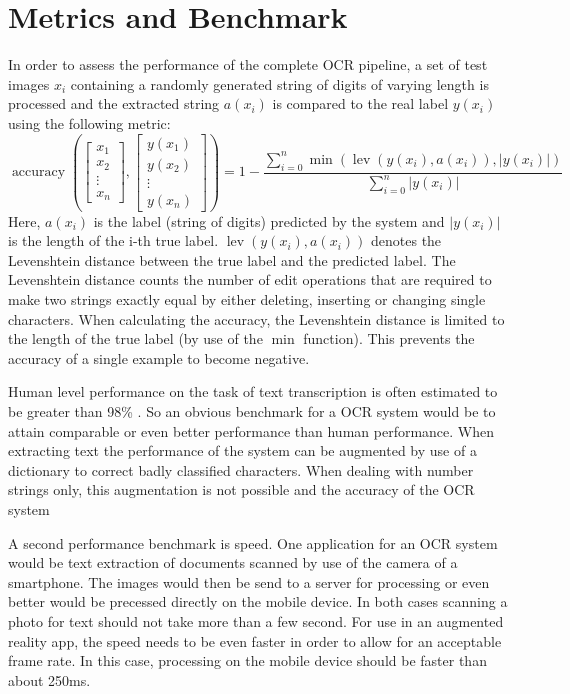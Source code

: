 \documentclass[11pt]{article}
\begin{document}
\section{Metrics and Benchmark}
In order to assess the performance of the complete OCR pipeline, a set of test images $x_i$ containing
a randomly generated string of digits of varying length is processed and the extracted string $a(x_i)$ is
compared to the real label $y(x_i)$ using the following metric:
\begin{equation}
  \operatorname{accuracy}(\begin{bmatrix}x_{1}\\x_{2}\\\vdots\\x_{n}\end{bmatrix},\begin{bmatrix}y(x_{1})\\y(x_{2})\\\vdots\\y(x_{n})\end{bmatrix}) = 1 - \frac{\sum\limits_{i=0}^n{\operatorname{min}\left(\operatorname{lev}(y(x_i), a(x_i)), |y(x_i)|\right)}}{\sum\limits_{i=0}^n{|y(x_i)|}}
\end{equation}
Here, $a(x_i)$ is the label (string of digits) predicted by the system and $|y(x_i)|$ is the length of
the i-th true label. $\operatorname{lev}(y(x_i), a(x_i))$ denotes the Levenshtein distance \cite{Levensht20:online} between
the true label and the predicted label. The Levenshtein distance counts the number of edit operations
that are required to make two strings exactly equal by either deleting, inserting or
changing single characters. When calculating the accuracy, the Levenshtein distance is limited to
the length of the true label (by use of the $\operatorname{min}$ function). This prevents the accuracy
of a single example to become negative.

Human level performance on the task of text transcription is often estimated to be greater
than 98\% \cite{Goodfellow2013}. So an obvious benchmark for a OCR system would be to
attain comparable or even better performance than human performance. When extracting text the
performance of the system can be augmented by use of a dictionary to correct badly classified
characters. When dealing with number strings only, this augmentation is not possible and
the accuracy of the OCR system

A second performance benchmark is speed. One application for an OCR system would be text extraction
of documents scanned by use of the camera of a smartphone. The images would then be send to
a server for processing or even better would be precessed directly on the mobile device.
In both cases scanning a photo for text should not take more than a few second. For use in
an augmented reality app, the speed needs to be even faster in order to allow for an acceptable
frame rate. In this case, processing on the mobile device should be faster than about
250ms.
\end{document}
